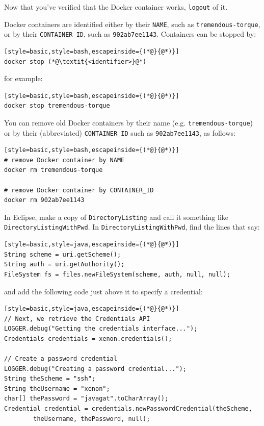 \documentclass[12pt, a4paper, twoside, openany, titlepage]{book}
\begin{document}
Now that you've verified that the Docker container works, \texttt{logout} of it.

Docker containers are identified either by their \texttt{NAME}, such as \texttt{tremendous-torque}, or by their \texttt{CONTAINER\_ID}, such as \texttt{902ab7ee1143}. Containers can be stopped by:
\begin{lstlisting}[style=basic,style=bash,escapeinside={(*@}{@*)}]
docker stop (*@\textit{<identifier>}@*)
\end{lstlisting}
for example:
\begin{lstlisting}[style=basic,style=bash,escapeinside={(*@}{@*)}]
docker stop tremendous-torque
\end{lstlisting}

You can remove old Docker containers by their name (e.g. \texttt{tremendous-torque}) or by their (abbreviated) \texttt{CONTAINER\_ID} such as \texttt{902ab7ee1143}, as follows:
\begin{lstlisting}[style=basic,style=bash,escapeinside={(*@}{@*)}]
# remove Docker container by NAME
docker rm tremendous-torque

# remove Docker container by CONTAINER_ID
docker rm 902ab7ee1143
\end{lstlisting} %


In Eclipse, make a copy of \texttt{DirectoryListing} and call it something like \texttt{DirectoryListingWithPwd}. In \texttt{DirectoryListingWithPwd}, find the lines that say:
\begin{lstlisting}[style=basic,style=java,escapeinside={(*@}{@*)}]
String scheme = uri.getScheme();
String auth = uri.getAuthority();
FileSystem fs = files.newFileSystem(scheme, auth, null, null);
\end{lstlisting}

and add the following code just above it to specify a credential:
\begin{lstlisting}[style=basic,style=java,escapeinside={(*@}{@*)}]
// Next, we retrieve the Credentials API
LOGGER.debug("Getting the credentials interface...");
Credentials credentials = xenon.credentials();

// Create a password credential
LOGGER.debug("Creating a password credential...");
String theScheme = "ssh";
String theUsername = "xenon";
char[] thePassword = "javagat".toCharArray();
Credential credential = credentials.newPasswordCredential(theScheme,
        theUsername, thePassword, null);
\end{lstlisting}
\end{document}
